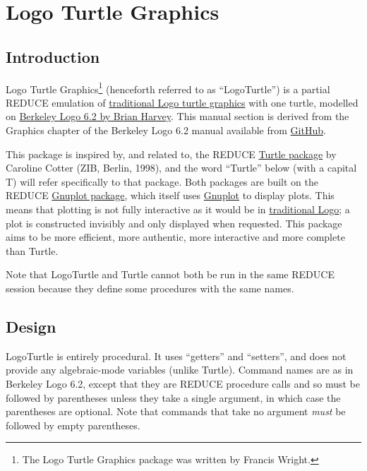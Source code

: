 \section{Logo Turtle Graphics}

\subsection{Introduction}

Logo Turtle Graphics\footnote{The Logo Turtle Graphics package was
written by Francis Wright.} (henceforth referred to as ``LogoTurtle'')
is a partial REDUCE emulation of
\href{https://en.wikipedia.org/wiki/Turtle_graphics}{traditional Logo
  turtle graphics} with one turtle, modelled on
\href{http://people.eecs.berkeley.edu/~bh/logo.html}{Berkeley Logo 6.2
  by Brian Harvey}.  This manual section is derived from the Graphics
chapter of the Berkeley Logo 6.2 manual available from
\href{https://github.com/jrincayc/ucblogo-code}{GitHub}.

This package is inspired by, and related to, the REDUCE
\hyperref[package:TURTLE]{Turtle package} by Caroline Cotter (ZIB,
Berlin, 1998), and the word ``Turtle'' below (with a capital T) will
refer specifically to that package.  Both packages are built on the
REDUCE \hyperref[package:GNUPLOT]{Gnuplot package}, which itself uses
\href{http://gnuplot.info/}{Gnuplot} to display plots.  This means
that plotting is not fully interactive as it would be in
\href{https://en.wikipedia.org/wiki/Logo_(programming_language)}{traditional
  Logo}; a plot is constructed invisibly and only displayed when
requested.  This package aims to be more efficient, more authentic,
more interactive and more complete than Turtle.

Note that LogoTurtle and Turtle cannot both be run in the same REDUCE
session because they define some procedures with the same names.

\subsection{Design}

LogoTurtle is entirely procedural.  It uses ``getters'' and
``setters'', and does not provide any algebraic-mode variables (unlike
Turtle).  Command names are as in Berkeley Logo 6.2, except that they
are REDUCE procedure calls and so must be followed by parentheses
unless they take a single argument, in which case the parentheses are
optional.  Note that commands that take no argument \emph{must} be
followed by empty parentheses.

